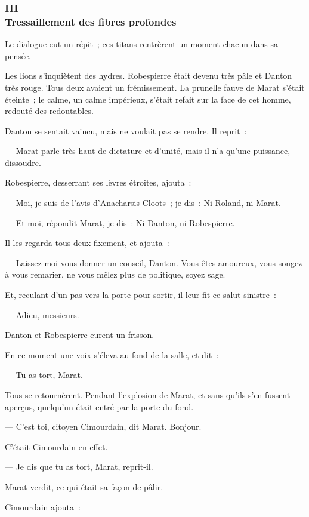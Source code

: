 \documentclass[french,twoside]{book} %
\begin{document}
 \subsubsection[{III. Tressaillement des fibres profondes}]{III \\
Tressaillement des fibres profondes}
\label{p2l2c3}
\noindent Le dialogue eut un répit ; ces titans rentrèrent un moment chacun dans sa pensée.\par
Les lions s’inquiètent des hydres. Robespierre était devenu très pâle et Danton très rouge. Tous deux avaient un frémissement. La prunelle fauve de Marat s’était éteinte ; le calme, un calme impérieux, s’était refait sur la face de cet homme, redouté des redoutables.\par
Danton se sentait vaincu, mais ne voulait pas se rendre. Il reprit :\par
— Marat parle très haut de dictature et d’unité, mais il n’a qu’une puissance, dissoudre.\par
Robespierre, desserrant ses lèvres étroites, ajouta :\par
— Moi, je suis de l’avis d’Anacharsis Cloots ; je dis : Ni Roland, ni Marat.\par
— Et moi, répondit Marat, je dis : Ni Danton, ni Robespierre.\par
Il les regarda tous deux fixement, et ajouta :\par
— Laissez-moi vous donner un conseil, Danton. Vous êtes amoureux, vous songez à vous remarier, ne vous mêlez plus de politique, soyez sage.\par
 Et, reculant d’un pas vers la porte pour sortir, il leur fit ce salut sinistre :\par
— Adieu, messieurs.\par
Danton et Robespierre eurent un frisson.\par
En ce moment une voix s’éleva au fond de la salle, et dit :\par
— Tu as tort, Marat.\par
Tous se retournèrent. Pendant l’explosion de Marat, et sans qu’ils s’en fussent aperçus, quelqu’un était entré par la porte du fond.\par
— C’est toi, citoyen Cimourdain, dit Marat. Bonjour.\par
C’était Cimourdain en effet.\par
— Je dis que tu as tort, Marat, reprit-il.\par
Marat verdit, ce qui était sa façon de pâlir.\par
Cimourdain ajouta :\par
\end{document}

